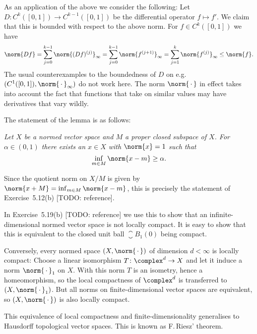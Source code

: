 \documentclass[article, a4paper, 11pt, oneside]{memoir}
\numberwithin{equation}{chapter}
\theoremstyle{nonumberplain}
\begin{document}
\begin{remark}
	As an application of the above we consider the following: Let $D \colon C^k([0,1]) \to C^{k-1}([0,1])$ be the differential operator $f \mapsto f'$. We claim that this is bounded with respect to the above norm. For $f \in C^k([0,1])$ we have
	\begin{equation*}
		\norm{Df}
			= \sum_{j=0}^{k-1} \norm{(Df)^{(j)}}_\infty
			= \sum_{j=0}^{k-1} \norm{f^{(j+1)}}_\infty
			= \sum_{j=1}^k \norm{f^{(j)}}_\infty
			\leq \norm{f}.
	\end{equation*}
	The usual counterexamples to the boundedness of $D$ on e.g. $(C^1([0,1]), \norm{\,\cdot\,}_\infty)$ do not work here. The norm $\norm{\,\cdot\,}$ in effect takes into account the fact that functions that take on similar values may have derivatives that vary wildly.
\end{remark}


\begin{remarkbreak}
	The statement of the lemma is as follows:
	\begin{displayquote} %
		\itshape
		Let $X$ be a normed vector space and $M$ a proper closed subspace of $X$. For $\alpha \in (0,1)$ there exists an $x \in X$ with $\norm{x} = 1$ such that
		\begin{equation*}
			\inf_{m \in M} \norm{x - m} \geq \alpha.
		\end{equation*}
	\end{displayquote}
	Since the quotient norm on $X/M$ is given by $\norm{x+M} = \inf_{m \in M} \norm{x-m}$, this is precisely the statement of Exercise~5.12(b) [TODO: reference].

	In Exercise~5.19(b) [TODO: reference] we use this to show that an infinite-dimensional normed vector space is not locally compact. It is easy to show that this is equivalent to the closed unit ball $\closure{B}_1(0)$ being compact.
	
	Conversely, every normed space $(X, \norm{\,\cdot\,})$ of dimension $d < \infty$ is locally compact: Choose a linear isomorphism $T \colon \complex^d \to X$ and let it induce a norm $\norm{\,\cdot\,}_1$ on $X$. With this norm $T$ is an isometry, hence a homeomorphism, so the local compactness of $\complex^d$ is transferred to $(X, \norm{\,\cdot\,}_1)$. But all norms on finite-dimensional vector spaces are equivalent, so $(X, \norm{\,\cdot\,})$ is also locally compact.

	This equivalence of local compactness and finite-dimensionality generalises to Hausdorff topological vector spaces. This is known as F.\,Riesz' theorem.
\end{remarkbreak}
\end{document}
